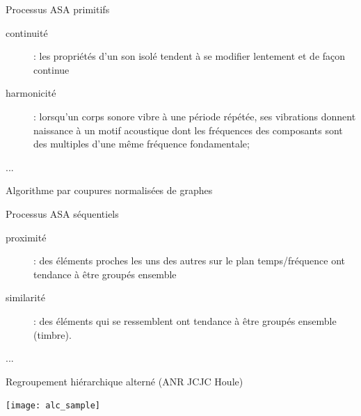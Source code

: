 
\begin{frame}{Processus ASA \og primitifs \fg}
\begin{description}
\item[\alert{continuité}] : les propriétés d'un son isolé tendent à se modifier lentement et de façon continue
\item[\alert{harmonicité}] : lorsqu'un corps sonore vibre à une période répétée, ses vibrations donnent naissance à un motif acoustique dont les fréquences des composants sont des multiples d'une même fréquence fondamentale;
\item[...]
\end{description}
\end{frame}

\begin{frame}{Algorithme par coupures normalisées de graphes}
\begin{center}
\end{center}
\end{frame}



\begin{frame}{Processus ASA \og séquentiels \fg}
\begin{description}
\item[proximité] : des éléments proches les uns des autres sur le plan temps/fréquence ont tendance à être groupés ensemble
\item[similarité] : des éléments qui se ressemblent ont tendance à être groupés ensemble (timbre).
\item[...]
\end{description}
\end{frame}

\begin{frame}{Regroupement hiérarchique alterné (ANR JCJC Houle)}
\begin{center}
   \texttt{[image: alc\_sample]}
\end{center}
\end{frame}

